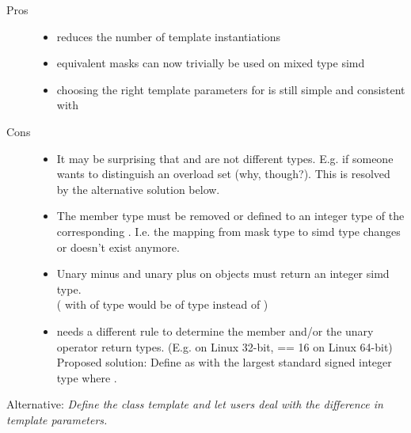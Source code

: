 \begin{description}
  \item[Pros]
    \begin{itemize}
      \item reduces the number of template instantiations

      \item equivalent masks can now trivially be used on mixed type simd

      \item choosing the right template parameters for \mask is still simple
        and consistent with \simd
    \end{itemize}

  \item[Cons]
    \begin{itemize}
      \item It may be surprising that \mask[<T, Abi>] and \mask[<U, Abi>] are
        not different types.
        E.g. if someone wants to distinguish an overload set (why, though?).
        This is resolved by the alternative solution below.

      \item The  member type must be removed or
        defined to an integer type of the corresponding .
        I.e. the mapping from mask type to simd type changes or doesn't exist
        anymore.

      \item Unary minus and unary plus on \mask objects must return an integer
        simd type.\\
        ( with  of type  would be of
        type  instead of )

      \item {} needs a different rule to
        determine the  member and/or the unary operator return
        types.
        (E.g.  on Linux 32-bit,
         == 16 on Linux 64-bit)
        Proposed solution: Define  as
         with  the largest standard signed integer
        type where .
    \end{itemize}
\end{description}

Alternative: \emph{Define the class template  and let users deal with the difference in template
parameters.}

